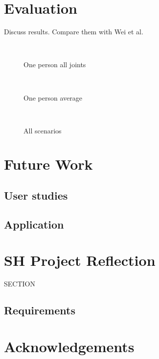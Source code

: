 \documentclass{sigchi}
\begin{document}
\section{Evaluation}
\label{sec:evaluation}

Discuss results. Compare them with Wei et al.

\begin{figure}[!h]
  \centering
  
  \caption{One person all joints}~\label{fig:one_person_all}
\end{figure}

\begin{figure}[!h]
  \centering
  
  \caption{One person average}~\label{fig:one_person_average}
\end{figure}

\begin{figure}[!h]
  \centering
  
  \caption{All scenarios}~\label{fig:scenarios}
\end{figure}

\section{Future Work}
\label{sec:future_work}

\subsection{User studies}

\subsection{Application}

\section{SH Project Reflection}

SECTION

\subsection{Requirements}

\section{Acknowledgements}
\label{sec:acknowledge}
\end{document}
